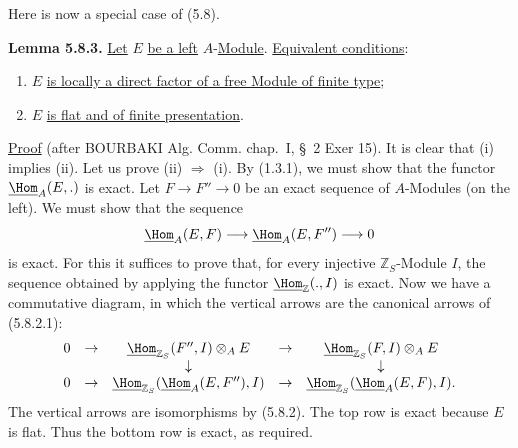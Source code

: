 %
Here is now a special case of (5.8).

\textbf{Lemma 5.8.3.} \uline{Let} \(E\) \uline{be a left} \(A\)-\uline{Module}. \uline{Equivalent conditions}:
\begin{enumerate}[label=(\roman*)]
\item \(E\) \uline{is locally a direct factor of a free Module of finite type};
\item \(E\) \uline{is flat and of finite presentation}.
\end{enumerate}

\uline{Proof} (after BOURBAKI Alg. Comm. chap.\ I, \S\ 2 Exer 15). It is clear that (i) implies (ii). Let us prove (ii) \(\Rightarrow\) (i). By (1.3.1), we must show that the functor \(\underline{\Hom}_A(E,.)\) is exact. Let \(F\longrightarrow F''\longrightarrow 0\) be an exact sequence of \(A\)-Modules (on the left). We must show that the sequence
\[
  \underline{\Hom}_A(E,F)\longrightarrow \underline{\Hom}_A(E,F'')\longrightarrow 0
\]
is exact. For this it suffices to prove that, for every injective \(\mathbb Z_S\)-Module \(I\), the sequence obtained by applying the functor \(\underline{\Hom}_{\mathbb Z}(.,I)\) is exact. Now we have a commutative diagram, in which the vertical arrows are the canonical arrows of (5.8.2.1):
\[
\begin{array}{ccccccccc}
0&\to&\underline{\Hom}_{\mathbb Z_S}(F'',I)\otimes_A E&\to&\underline{\Hom}_{\mathbb Z_S}(F,I)\otimes_A E\\
&&\downarrow&&\downarrow\\
0&\to&\underline{\Hom}_{\mathbb Z_S}(\underline{\Hom}_A(E,F''),I)&\to&\underline{\Hom}_{\mathbb Z_S}(\underline{\Hom}_A(E,F),I).
\end{array}
\]
The vertical arrows are isomorphisms by (5.8.2). The top row is exact because \(E\) is flat. Thus the bottom row is exact, as required.

